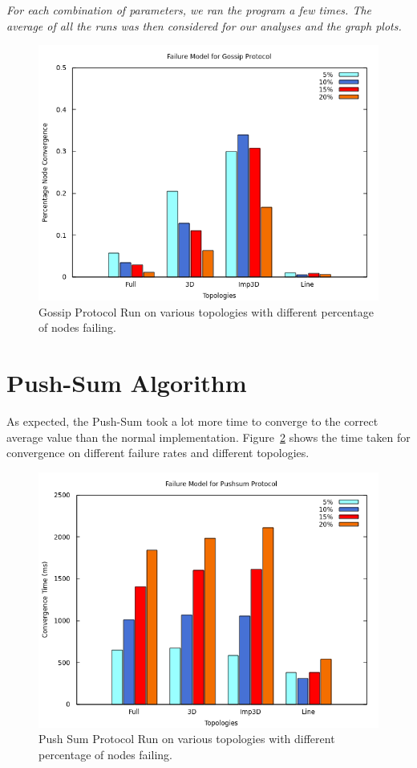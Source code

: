 \documentclass[11pt]{article}
\begin{document}
\textit{For each combination of parameters, we ran the program a few times. The average of all the runs was then considered for our analyses and the graph plots.}
\begin{figure}[h]
    \includegraphics[scale=0.75]{gossip_failure.png}
    \caption{Gossip Protocol Run on various topologies with different percentage of nodes failing.}
    \label{gossip_failure}
\end{figure}

\section{Push-Sum Algorithm}
As expected, the Push-Sum took a lot more time to converge to the correct average value than the normal implementation. Figure~\ref{pushsum_failure} shows the time taken for convergence on different failure rates and different topologies.
\begin{figure}[h]
    \includegraphics[scale=0.75]{pushsum_failure.png}
    \caption{Push Sum Protocol Run on various topologies with different percentage of nodes failing.}
    \label{pushsum_failure}
\end{figure}
\end{document}
